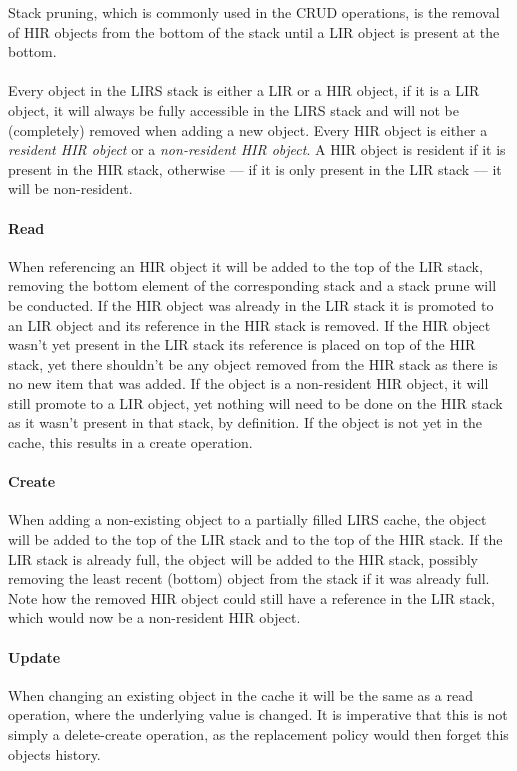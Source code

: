 \documentclass[pdftex,a4paper,12pt,twoside]{report}
\begin{document}
Stack pruning, which is commonly used in the CRUD operations, is the removal of HIR objects from the bottom of the stack until a LIR object is present at the bottom.
\\\\
Every object in the LIRS stack is either a LIR or a HIR object, if it is a LIR object, it will always be fully accessible in the LIRS stack and will not be (completely) removed when adding a new object. Every HIR object is either a \emph{resident HIR object} or a \emph{non-resident HIR object}. A HIR object is resident if it is present in the HIR stack, otherwise --- if it is only present in the LIR stack --- it will be non-resident.
\paragraph{Read} When referencing an HIR object it will be added to the top of the LIR stack, removing the bottom element of the corresponding stack and a stack prune will be conducted. If the HIR object was already in the LIR stack it is promoted to an LIR object and its reference in the HIR stack is removed. If the HIR object wasn't yet present in the LIR stack its reference is placed on top of the HIR stack, yet there shouldn't be any object removed from the HIR stack as there is no new item that was added. If the object is a non-resident HIR object, it will still promote to a LIR object, yet nothing will need to be done on the HIR stack as it wasn't present in that stack, by definition. If the object is not yet in the cache, this results in a create operation.
\paragraph{Create} When adding a non-existing object to a partially filled LIRS cache, the object will be added to the top of the LIR stack and to the top of the HIR stack. If the LIR stack is already full, the object will be added to the HIR stack, possibly removing the least recent (bottom) object from the stack if it was already full. Note how the removed HIR object could still have a reference in the LIR stack, which would now be a non-resident HIR object.
\paragraph{Update} When changing an existing object in the cache it will be the same as a read operation, where the underlying value is changed. It is imperative that this is not simply a delete-create operation, as the replacement policy would then forget this objects history.
\end{document}
